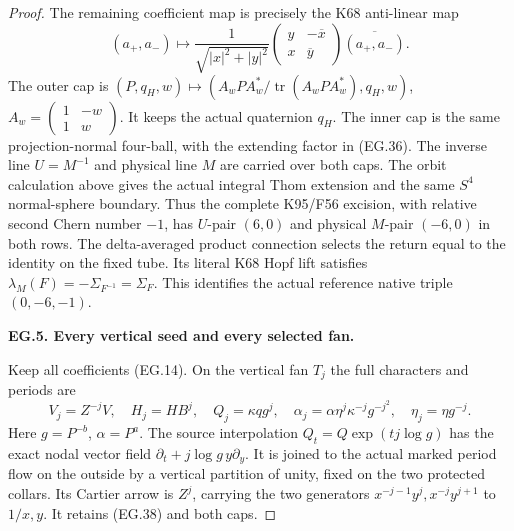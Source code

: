 \begin{proof}
The remaining coefficient map is precisely
the K68 anti-linear map
\[
 (a_+,a_-)\longmapsto
 \frac1{\sqrt{|x|^2+|y|^2}}
 \begin{pmatrix}y&-\overline x\\x&\overline y\end{pmatrix}
 \overline{(a_+,a_-)} .
 \tag{EG.39}
\]
The outer cap is
\((P,q_H,w)\mapsto(A_wPA_w^*/\operatorname{tr}(A_wPA_w^*),
q_H,w)\), \(A_w=\left(\begin{smallmatrix}1&-w\\1&w\end{smallmatrix}\right)\).
It keeps the actual quaternion \(q_H\).
The inner cap is the same projection-normal
four-ball, with the extending factor in
(EG.36). The inverse line \(U=M^{-1}\)
and physical line \(M\) are carried over
both caps. The orbit calculation above
gives the actual integral Thom extension
and the same \(S^4\) normal-sphere boundary.
Thus the complete K95/F56 excision,
with relative second Chern number \(-1\),
has \(U\)-pair \((6,0)\) and physical
\(M\)-pair \((-6,0)\) in both rows.
The delta-averaged product connection
selects the return equal to the identity
on the fixed tube. Its literal K68
Hopf lift satisfies
\(\lambda_M(F)=-\Sigma_{F^{-1}}=\Sigma_F\).
This identifies the actual reference
native triple \((0,-6,-1)\).

\par\medskip\noindent\textbf{EG.5. Every vertical seed and every selected fan.}\par\nopagebreak[4]

Keep all coefficients (EG.14). On the
vertical fan \(T_j\) the full characters
and periods are
\[
 V_j=Z^{-j}V,\quad H_j=HB^j,\quad
 Q_j=\kappa qg^j,\quad
 \alpha_j=\alpha\eta^j\kappa^{-j}g^{-j^2},\quad
 \eta_j=\eta g^{-j}.
 \tag{EG.40}
\]
Here \(g=P^{-b}\), \(\alpha=P^a\).
The source interpolation
\(Q_t=Q\exp(tj\log g)\) has the exact
nodal vector field
\(\partial_t+j\log g\,y\partial_y\).
It is joined to the actual marked
period flow on the outside by a
vertical partition of unity, fixed
on the two protected collars.
Its Cartier arrow is \(Z^j\),
carrying the two generators
\(x^{-j-1}y^j,x^{-j}y^{j+1}\)
to \(1/x,y\). It retains (EG.38)
and both caps.


\end{proof}
